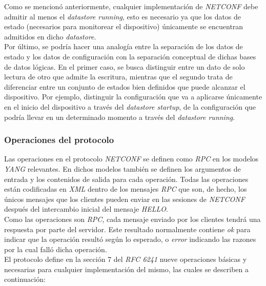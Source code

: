Como se mencionó anteriormente, cualquier implementación de \textit{NETCONF} debe admitir al menos el \textit{datastore running}, esto es necesario ya que los datos de estado (necesarios para monitorear el dispositivo) únicamente se encuentran admitidos en dicho \textit{datastore}.
\\

Por último, se podría hacer una analogía entre la separación de los datos de estado y los datos de configuración con la separación conceptual de dichas bases de datos lógicas. 
En el primer caso, se busca distinguir entre un dato de solo lectura de otro que admite la escritura, mientras que el segundo trata de diferenciar entre un conjunto de estados bien definidos que puede alcanzar el dispositivo. Por ejemplo, distinguir la configuración que va a aplicarse únicamente en el inicio del dispositivo a través del \textit{datastore startup}, de la configuración que podría llevar en un determinado momento a través del \textit{datastore running}.


\subsubsection{Operaciones del protocolo}

Las operaciones en el protocolo \textit{NETCONF} se definen como \textit{RPC} en los modelos \textit{YANG} relevantes. En dichos modelos también se definen los argumentos de entrada y los contenidos de salida para cada operación. Todas las operaciones están codificadas en \textit{XML} dentro de los mensajes \textit{RPC} que son, de hecho, los únicos mensajes que los clientes pueden enviar en las sesiones de \textit{NETCONF} después del intercambio inicial del mensaje \textit{HELLO}. 
\\

Como las operaciones son \textit{RPC}, cada mensaje enviado por los clientes tendrá una respuesta por parte del servidor. Este resultado normalmente contiene \textit{ok} para indicar que la operación resultó según lo esperado, o \textit{error} indicando las razones por la cual falló dicha operación.
\\

El protocolo define en la sección 7 del \textit{RFC 6241} nueve operaciones básicas y necesarias para cualquier implementación del mismo, las cuales se describen a continuación:

